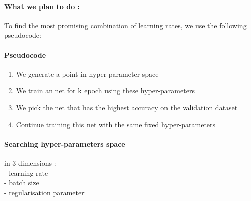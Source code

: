 \documentclass[11pt]{article}
\providecommand{\tightlist}{%
      \setlength{\itemsep}{0pt}\setlength{\parskip}{0pt}}
\begin{document}
    \paragraph{What we plan to do :}\label{what-we-plan-to-do}

To find the most promising combination of learning rates, we use the
following pseudocode:

\paragraph{Pseudocode}\label{pseudocode}

\begin{enumerate}
\def\labelenumi{\arabic{enumi}.}
\tightlist
\item
  We generate a point in hyper-parameter space\\
\item
  We train an net for k epoch using these hyper-parameters\\
\item
  We pick the net that has the highest accuracy on the validation
  dataset\\
\item
  Continue training this net with the same fixed hyper-parameters
\end{enumerate}

\paragraph{Searching hyper-parameters
space}\label{searching-hyper-parameters-space}

in 3 dimensions :\\
- learning rate\\
- batch size\\
- regularisation parameter
\end{document}
